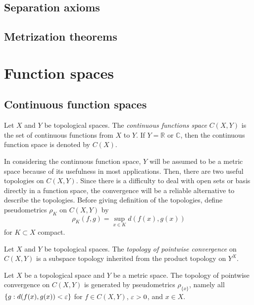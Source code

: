 \documentclass{../crs}
\begin{document}
\section{Separation axioms}
\section{Metrization theorems}





\chapter{Function spaces}






\section{Continuous function spaces}

\begin{defn}
Let $X$ and $Y$ be topological spaces.
The \emph{continuous functions space} $C(X,Y)$ is the set of continuous functions from $X$ to $Y$.
If $Y=\mathbb{R}$ or $\mathbb{C}$, then the continuous function space is denoted by $C(X)$.
\end{defn}

In considering the continuous function space, $Y$ will be assumed to be a metric space because of its usefulness in most applications.
Then, there are two useful topologies on $C(X,Y)$.
Since there is a difficulty to deal with open sets or basis directly in a function space, the convergence will be a reliable alternative to describe the topologies.
Before giving definition of the topologies, define pseudometrics $\rho_K$ on $C(X,Y)$ by
\[\rho_K(f,g)=\sup_{x\in K}d(f(x),g(x))\]
for $K\subset X$ compact.

\begin{defn}
Let $X$ and $Y$ be topological spaces.
The \emph{topology of pointwise convergence} on $C(X,Y)$ is a subspace topology inherited from the product topology on $Y^X$.
\end{defn}

\begin{prop}
Let $X$ be a topological space and $Y$ be a metric space.
The topology of pointwise convergence on $C(X,Y)$ is generated by pseudometrics $\rho_{\{x\}}$, namely all $\{g:d(f(x),g(x))<\varepsilon\}$ for $f\in C(X,Y)$, $\varepsilon>0$, and $x\in X$.
\end{prop}
\end{document}
